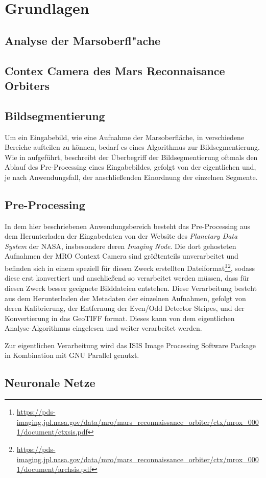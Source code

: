 \chapter{Grundlagen}
\label{chap:grundlagen}

\section{Analyse der Marsoberfl"ache}
\label{sec:analysedermarsoberflache}


\section{Contex Camera des Mars Reconnaisance Orbiters}
\label{sec:mroctx}

\section{Bildsegmentierung}
\label{sec:segmentierung}

Um ein Eingabebild, wie \zB eine Aufnahme der Marsoberfläche, in verschiedene Bereiche aufteilen zu können, bedarf es eines Algorithmus zur Bildsegmentierung. Wie in \cite{bildsegmentierung} aufgeführt, beschreibt der Überbegriff der Bildsegmentierung oftmals den Ablauf des Pre-Processing eines Eingabebildes, gefolgt von der eigentlichen  und, je nach Anwendungsfall, der anschließenden Einordnung der einzelnen Segmente.

\section{Pre-Processing}
\label{sec:preprocessing}

In dem hier beschriebenen Anwendungsbereich besteht das Pre-Processing aus dem Herunterladen der Eingabedaten von der Website des \textit{Planetary Data System} der NASA, insbesondere deren \textit{Imaging Node}\cite{pds}. Die dort gehosteten Aufnahmen der MRO Context Camera sind größtenteils unverarbeitet und befinden sich in einem speziell für diesen Zweck erstellten Dateiformat\footnote{\url{https://pds-imaging.jpl.nasa.gov/data/mro/mars\_reconnaissance\_orbiter/ctx/mrox\_0001/document/ctxsis.pdf}}\footnote{\url{https://pds-imaging.jpl.nasa.gov/data/mro/mars\_reconnaissance\_orbiter/ctx/mrox\_0001/document/archsis.pdf}}, sodass diese erst konvertiert und anschließend so verarbeitet werden müssen, dass für diesen Zweck besser geeignete Bilddateien entstehen.
Diese Verarbeitung besteht aus dem Herunterladen der Metadaten der einzelnen Aufnahmen, gefolgt von deren Kalibrierung, der Entfernung der Even/Odd Detector Stripes, und der Konvertierung in das GeoTIFF format. Dieses kann von dem eigentlichen Analyse-Algorithmus eingelesen und weiter verarbeitet werden.

Zur eigentlichen Verarbeitung wird das ISIS Image Processing Software Package\cite{isis} in Kombination mit GNU Parallel\cite{gnuparallel} genutzt.

\section{Neuronale Netze}
\label{sec:neuronalenetze}